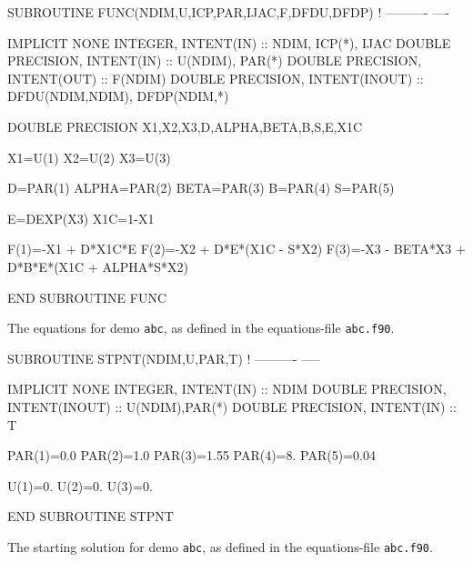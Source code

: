 \documentclass[12pt]{report}
\begin{document}
\begin{table}[htbp]
{\small
\begin{center}
\begin{boxedverbatim}
      SUBROUTINE FUNC(NDIM,U,ICP,PAR,IJAC,F,DFDU,DFDP) 
!     ---------- ---- 

      IMPLICIT NONE
      INTEGER, INTENT(IN) :: NDIM, ICP(*), IJAC
      DOUBLE PRECISION, INTENT(IN) :: U(NDIM), PAR(*)
      DOUBLE PRECISION, INTENT(OUT) :: F(NDIM)
      DOUBLE PRECISION, INTENT(INOUT) :: DFDU(NDIM,NDIM), DFDP(NDIM,*)

      DOUBLE PRECISION X1,X2,X3,D,ALPHA,BETA,B,S,E,X1C

       X1=U(1)
       X2=U(2)
       X3=U(3)

       D=PAR(1)
       ALPHA=PAR(2)
       BETA=PAR(3)
       B=PAR(4)
       S=PAR(5)

       E=DEXP(X3)
       X1C=1-X1

       F(1)=-X1 + D*X1C*E
       F(2)=-X2 + D*E*(X1C - S*X2)
       F(3)=-X3 - BETA*X3 + D*B*E*(X1C + ALPHA*S*X2)

      END SUBROUTINE FUNC
\end{boxedverbatim}
\end{center}
}
\caption{The equations for demo {\tt abc}, 
as defined in the equations-file {\tt abc.f90}.}
\label{tbl:demo_abcE1}
\end{table}


\begin{table}[htbp]
{\small
\begin{center}
\begin{boxedverbatim}
      SUBROUTINE STPNT(NDIM,U,PAR,T) 
!     ---------- ----- 

      IMPLICIT NONE
      INTEGER, INTENT(IN) :: NDIM
      DOUBLE PRECISION, INTENT(INOUT) :: U(NDIM),PAR(*)
      DOUBLE PRECISION, INTENT(IN) :: T

       PAR(1)=0.0
       PAR(2)=1.0
       PAR(3)=1.55
       PAR(4)=8.
       PAR(5)=0.04

       U(1)=0.
       U(2)=0.
       U(3)=0.

      END SUBROUTINE STPNT
\end{boxedverbatim}
\end{center}
}
\caption{The starting solution for demo {\tt abc}, 
as defined in the equations-file {\tt abc.f90}.}
\label{tbl:demo_abcE2}
\end{table}
\end{document}

